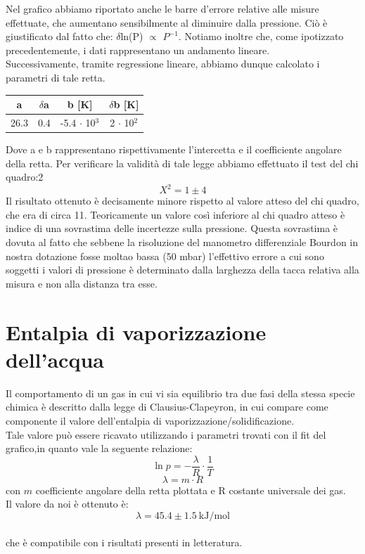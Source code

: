 \documentclass[11pt]{article}
\begin{document}
Nel grafico abbiamo riportato anche le barre d'errore relative alle misure effettuate, che aumentano sensibilmente al diminuire dalla pressione. Ciò è giustificato dal fatto che: $\delta$ln(P) $\propto$ $P^{-1}$. Notiamo inoltre che, come ipotizzato precedentemente, i dati rappresentano un andamento lineare.\\
Successivamente, tramite regressione lineare, abbiamo dunque calcolato i parametri di tale retta. 
\begin{center}
\begin{tabular}{|c|c|c|c|}
\hline
a & $\delta$a & b [\unit{K}] & $\delta$b [\unit{K}]\\
\hline
 26.3 & 0.4 & -5.4 $\cdot$ 10$^{3}$ & 2 $\cdot$ 10$^{2}$ \\
\hline
\end{tabular}
\end{center}
Dove a e b rappresentano rispettivamente l'intercetta e il coefficiente angolare della retta. Per verificare la validità di tale legge abbiamo effettuato il test del chi quadro:2
\begin{equation}
X^2 = 1 \pm 4
\end{equation}
Il risultato ottenuto è decisamente minore rispetto al valore atteso del chi quadro, che era di circa 11. Teoricamente un valore così inferiore al chi quadro atteso è indice di una sovrastima delle incertezze sulla pressione. Questa sovrastima è dovuta al fatto che sebbene la risoluzione del manometro differenziale Bourdon in  nostra dotazione fosse moltao bassa (50 \unit{mbar}) l'effettivo errore a cui sono soggetti i valori di pressione è determinato dalla larghezza della tacca relativa alla misura e non alla distanza tra esse.

\section{Entalpia di vaporizzazione dell'acqua}
Il comportamento di un gas in cui vi sia equilibrio tra due fasi della stessa specie chimica è descritto dalla legge di Clausius-Clapeyron, in cui compare come componente il valore dell'entalpia di vaporizzazione/solidificazione. 
\\
Tale valore può essere ricavato utilizzando i parametri trovati con il fit del grafico,in quanto vale la seguente relazione:
$$\ln{p}= -\frac{\lambda}{R}\cdot\frac{1}{T}$$
$$\lambda =m \cdot R$$
con $m$ coefficiente angolare della retta plottata e R costante universale dei gas. \\
Il valore da noi è ottenuto è:
$$\lambda = 45.4 \pm 1.5 ~\text{kJ}/\text{mol}$$   
\\che è compatibile con i risultati presenti in letteratura. 
\end{document}
